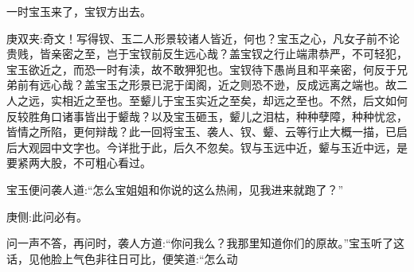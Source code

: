 \begin{parag}
    一时宝玉来了，宝钗方出去。\begin{note}庚双夹:奇文！写得钗、玉二人形景较诸人皆近，何也？宝玉之心，凡女子前不论贵贱，皆亲密之至，岂于宝钗前反生远心哉？盖宝钗之行止端肃恭严，不可轻犯，宝玉欲近之，而恐一时有渎，故不敢狎犯也。宝钗待下愚尚且和平亲密，何反于兄弟前有远心哉？盖宝玉之形景已泥于闺阁，近之则恐不逊，反成远离之端也。故二人之远，实相近之至也。至颦儿于宝玉实近之至矣，却远之至也。不然，后文如何反较胜角口诸事皆出于颦哉？以及宝玉砸玉，颦儿之泪枯，种种孽障，种种忧忿，皆情之所陷，更何辩哉？此一回将宝玉、袭人、钗、颦、云等行止大概一描，已启后大观园中文字也。今详批于此，后久不忽矣。钗与玉远中近，颦与玉近中远，是要紧两大股，不可粗心看过。\end{note}宝玉便问袭人道:“怎么宝姐姐和你说的这么热闹，见我进来就跑了？”\begin{note}庚侧:此问必有。\end{note}问一声不答，再问时，袭人方道:“你问我么？我那里知道你们的原故。”宝玉听了这话，见他脸上气色非往日可比，便笑道:“怎么动
\end{parag}
